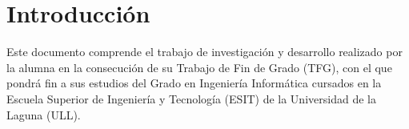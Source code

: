 %
%

\chapter*{Introducción}

Este documento comprende el trabajo de investigación y desarrollo realizado por la alumna en la consecución de su Trabajo de Fin de Grado (TFG), con el que pondrá fin a sus estudios del Grado en Ingeniería Informática cursados en la Escuela Superior de Ingeniería y Tecnología (ESIT) de la Universidad de la Laguna (ULL).
